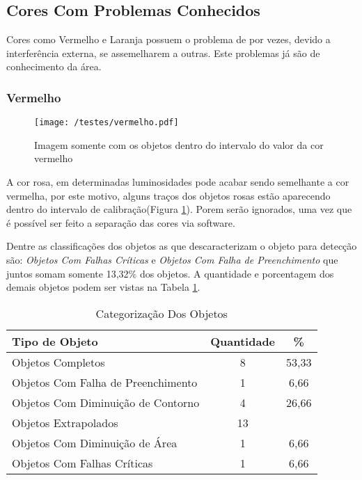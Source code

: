 \subsection{Cores Com Problemas Conhecidos}
Cores como Vermelho e Laranja possuem o problema de por vezes, devido a interferência externa, se assemelharem a outras. Este problemas já são de conhecimento da área.
	
	
\subsubsection{Vermelho}
	\begin{figure}[H]
		\centering
		\texttt{[image: /testes/vermelho.pdf]}
		\caption{Imagem somente com os objetos dentro do intervalo do valor da cor vermelho}
		\label{fig:vermelho}
	\end{figure}

A cor rosa, em determinadas luminosidades pode acabar sendo semelhante a cor vermelha, por este motivo, alguns traços dos objetos rosas estão aparecendo dentro do intervalo de calibração(Figura \ref{fig:vermelho}). Porem serão ignorados, uma vez que é possível ser feito a separação das cores via software.	

Dentre as classificações dos objetos as que 
descaracterizam o objeto para detecção são: \textit{Objetos Com Falhas Críticas} e \textit{Objetos Com Falha de Preenchimento} que juntos somam somente 13,32\% dos objetos. A quantidade e porcentagem dos demais objetos podem ser vistas na Tabela \ref{tab:vermelho}.
	
	\begin{table}[h]
\centering
\begin{tabular}{l|c|c}
Tipo de Objeto & Quantidade  & \% \\ %
\hline                               %
Objetos Completos &  8 & 53,33 \\
\hline 
Objetos Com Falha de Preenchimento & 1 & 6,66 \\
\hline 
Objetos Com Diminuição de Contorno &  4 & 26,66 \\
\hline 
Objetos Extrapolados &  13 \\
\hline 
Objetos Com Diminuição de Área &  1 &6,66 \\
\hline 
Objetos Com Falhas Críticas &  1 & 6,66\\
\hline 
\end{tabular}
\caption{Categorização Dos Objetos}
\label{tab:vermelho}
\end{table}



